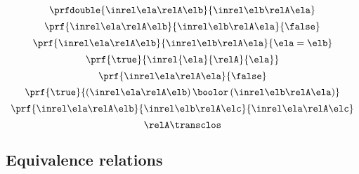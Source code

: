 \begin{forslides}
\begin{equation}
    \end{equation}
    \begin{equation}\label{eq:slides_session2_150}
        \prfdouble{
            \inrel \ela \relA \elb
        }{
            \inrel \elb \relA \ela
        }
    \end{equation}
    \begin{equation}\label{eq:slides_session2_151}
        \prf{
            \inrel \ela \relA \elb
        }{
            \inrel \elb \relA \ela
        }{
            \false
        }
    \end{equation}
    \begin{equation}\label{eq:slides_session2_152}
        \prf{
            \inrel \ela \relA \elb
        }{
            \inrel \elb \relA \ela
        }{
            \ela = \elb
        }
    \end{equation}
    \begin{equation}\label{eq:slides_session2_153}
        \prf{\true}{\inrel{\ela}{\relA}{\ela}}
    \end{equation}
    \begin{equation}\label{eq:slides_session2_154}
        \prf{
            \inrel \ela \relA \ela
        }{
            \false
        }
    \end{equation}
    \begin{equation}\label{eq:slides_session2_155}
        \prf{
            \true
        }{
            (\inrel\ela\relA\elb )\,\boolor\, (\inrel\elb\relA\ela)
        }
    \end{equation}
    \begin{equation}\label{eq:slides_session2_156}
        \prf{
            \inrel \ela \relA \elb
        }{
            \inrel \elb \relA \elc
        }{
            \inrel \ela \relA \elc
        }
    \end{equation}
    \begin{equation}\label{eq:slides_session2_157}
        \relA\transclos
    \end{equation}

    \subsection{Equivalence relations}


\end{forslides}
